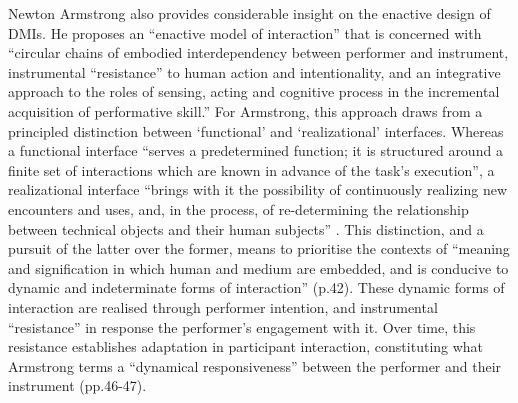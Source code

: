 Newton Armstrong also provides considerable insight on the enactive design of DMIs. He proposes an “enactive model of interaction” that is concerned with “circular chains of embodied interdependency between performer and instrument, instrumental “resistance” to human action and intentionality, and an integrative approach to the roles of sensing, acting and cognitive process in the incremental acquisition of performative skill.” For Armstrong, this approach draws from a principled distinction between ‘functional’ and ‘realizational’ interfaces. Whereas a functional interface “serves a predetermined function; it is structured around a finite set of interactions which are known in advance of the task’s execution”, a realizational interface “brings with it the possibility of continuously realizing new encounters and uses, and, in the process, of re-determining the relationship between technical objects and their human subjects” \citep[p. v]{armstrong2006}. This distinction, and a pursuit of the latter over the former, means to prioritise the contexts of “meaning and signification in which human and medium are embedded, and is conducive to dynamic and indeterminate forms of interaction” (p.42). These dynamic forms of interaction are realised through performer intention, and instrumental “resistance” in response the performer’s engagement with it. Over time, this resistance establishes adaptation in participant interaction, constituting what Armstrong terms a “dynamical responsiveness” between the performer and their instrument (pp.46-47).  

